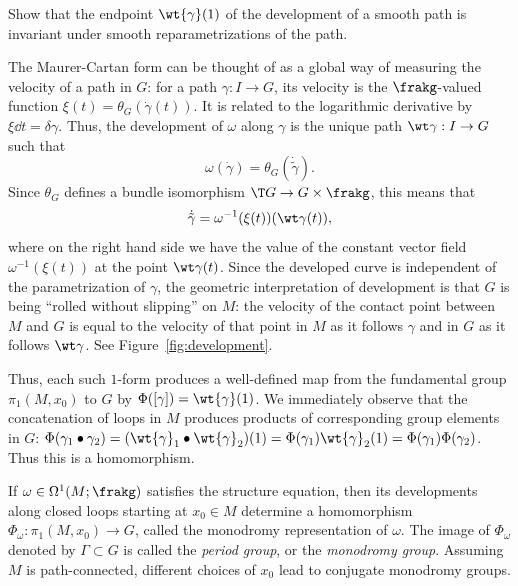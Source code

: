 \begin{xca}
    Show that the endpoint $\wt{\gamma}(1)$ of the development of a smooth path is invariant under smooth reparametrizations of the path.
\end{xca}

\begin{rem}
    The Maurer-Cartan form can be thought of as a global way of measuring the velocity of a path in $G$: for a path $\gamma:I\to G$, its velocity is the $\frakg$-valued function $\xi(t)=\theta_G(\dot\gamma(t))$. It is related to the logarithmic derivative by $\xi\dd t=\delta\gamma$. Thus, the development of $\omega$ along $\gamma$ is the unique path $\wt\gamma:I\to G$ such that 
    \[\omega(\dot\gamma)=\theta_G(\dot{\tilde\gamma}).\]
    Since $\theta_G$ defines a bundle isomorphism $\T G\to G\times\frakg$, this means that 
    \[\dot{\tilde\gamma}=\omega^{-1}(\xi(t))(\wt\gamma(t)),\]
    where on the right hand side we have the value of the constant vector field $\omega^{-1}(\xi(t))$ at the point $\wt\gamma(t)$. Since the developed curve is independent of the parametrization of $\gamma$, the geometric interpretation of development is that $G$ is being ``rolled without slipping'' on $M$: the velocity of the contact point between $M$ and $G$ is equal to the velocity of that point in $M$ as it follows $\gamma$ and in $G$ as it follows $\wt\gamma$. See Figure~\ref{fig:development}.
\end{rem}

Thus, each such $1$-form produces a well-defined map from the fundamental group $\pi_1(M,x_0)$ to $G$ by $\Phi([\gamma])=\wt{\gamma}(1)$. We immediately observe that the concatenation of loops in $M$ produces products of corresponding group elements in $G$: $\Phi(\gamma_1\bullet \gamma_2)=(\wt{\gamma}_1\bullet\wt{\gamma}_2)(1)=\Phi(\gamma_1)\wt{\gamma}_2(1)=\Phi(\gamma_1)\Phi(\gamma_2)$. Thus this is a homomorphism.

\begin{defn}
    If $\omega\in\Omega^1(M;\frakg)$ satisfies the structure equation, then its developments along closed loops starting at $x_0\in M$ determine a homomorphism $\Phi_\omega:\pi_1(M,x_0)\to G$, called the monodromy representation of $\omega$. The image of $\Phi_\omega$ denoted by $\Gamma\subset G$ is called the \emph{period group}, or the \emph{monodromy group}. Assuming $M$ is path-connected, different choices of $x_0$ lead to conjugate monodromy groups.
\end{defn}

